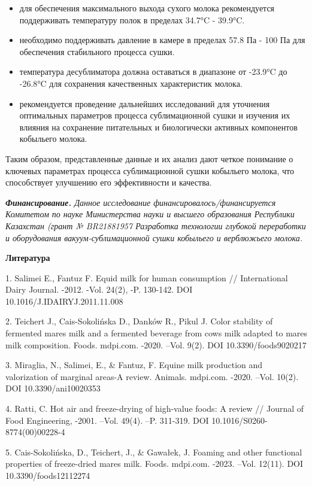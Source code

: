\begin{itemize}
\item
  для обеспечения максимального выхода сухого молока рекомендуется
  поддерживать температуру полок в пределах 34.7°C - 39.9°C.
\item
  необходимо поддерживать давление в камере в пределах 57.8 Па - 100 Па
  для обеспечения стабильного процесса сушки.
\item
  температура десублиматора должна оставаться в диапазоне от -23.9°C до
  -26.8°C для сохранения качественных характеристик молока.
\item
  рекомендуется проведение дальнейших исследований для уточнения
  оптимальных параметров процесса сублимационной сушки и изучения их
  влияния на сохранение питательных и биологически активных компонентов
  кобыльего молока.
\end{itemize}

Таким образом, представленные данные и их анализ дают четкое понимание о
ключевых параметрах процесса сублимационной сушки кобыльего молока, что
способствует улучшению его эффективности и качества.

\emph{{\bfseries Финансирование.} Данное исследование
финансировалось/финансируется Комитетом по науке Министерства науки и
высшего образования Республики Казахстан (грант № BR21881957 Разработка
технологии глубокой переработки и оборудования вакуум-сублимационной
сушки кобыльего и верблюжьего молока.}

{\bfseries Литература}

1. Salimei E., Fantuz F. Equid milk for human consumption //
International Dairy Journal. -2012. -Vol. 24(2), -P. 130-142. DOI
10.1016/J.IDAIRYJ.2011.11.008

2. Teichert J., Cais-Sokolińska D., Danków R., Pikul J. Color stability
of fermented mare\textquotesingle s milk and a fermented beverage from
cow\textquotesingle s milk adapted to mare\textquotesingle s milk
composition. Foods. mdpi.com. -2020. --Vol. 9(2). DOI
10.3390/foods9020217

3. Miraglia, N., Salimei, E., \& Fantuz, F. Equine milk production and
valorization of marginal areas-A review. Animals. mdpi.com. -2020.
--Vol. 10(2). DOI 10.3390/ani10020353

4. Ratti, C. Hot air and freeze-drying of high-value foods: A review //
Journal of Food Engineering, -2001. --Vol. 49(4). --P. 311-319. DOI
10.1016/S0260-8774(00)00228-4

5. Cais-Sokolińska, D., Teichert, J., \& Gawałek, J. Foaming and other
functional properties of freeze-dried mare\textquotesingle s milk.
Foods. mdpi.com. -2023. --Vol. 12(11). DOI 10.3390/foods12112274

